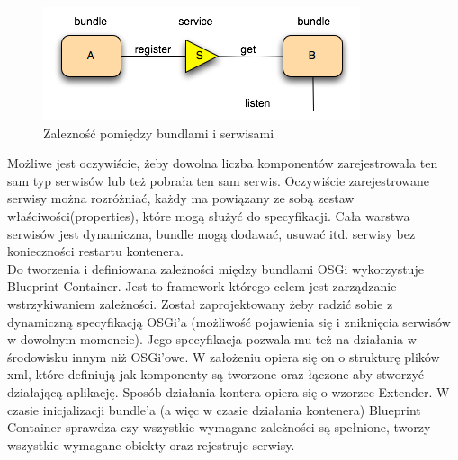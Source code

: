 \begin{figure}[!h]
	\centering
	\includegraphics[scale=0.75]{serveLayer.png} 
	\caption{Zalezność pomiędzy bundlami i serwisami}
\end{figure}
 Możliwe jest oczywiście, żeby dowolna liczba komponentów zarejestrowała ten sam typ serwisów lub też pobrała ten sam serwis. Oczywiście zarejestrowane serwisy można rozróżniać, każdy ma powiązany ze sobą zestaw właściwości(properties), które mogą służyć do specyfikacji. Cała warstwa serwisów jest dynamiczna, bundle mogą dodawać, usuwać itd. serwisy bez konieczności restartu kontenera.  \\
Do tworzenia i definiowana zależności między bundlami OSGi wykorzystuje Blueprint Container. Jest to framework którego celem jest zarządzanie wstrzykiwaniem zależności. Został zaprojektowany żeby radzić sobie z dynamiczną specyfikacją OSGi'a (możliwość pojawienia się i zniknięcia serwisów w dowolnym momencie). Jego specyfikacja pozwala mu też na działania w środowisku innym niż OSGi'owe. W założeniu opiera się on o strukturę plików xml, które definiują jak komponenty są tworzone oraz łączone aby stworzyć działającą aplikację. Sposób działania kontera opiera się o wzorzec Extender. W czasie inicjalizacji bundle'a (a więc w czasie działania kontenera) Blueprint Container sprawdza czy wszystkie wymagane zależności są spełnione, tworzy wszystkie wymagane obiekty oraz rejestruje serwisy. 

